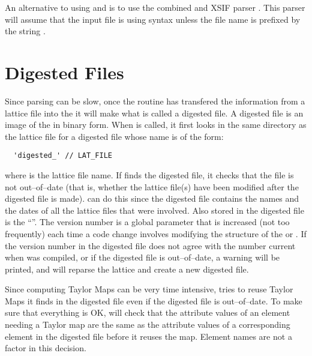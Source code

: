 An alternative to using  and  is to
use the combined \bmad and XSIF parser
. This parser
will assume that the input file is using \bmad syntax unless the file
name is prefixed by the string .

\section{Digested Files}

Since parsing can be slow, once the  routine
has transfered the
information from a lattice file into the  it will make
what is called a digested file. A digested file is an image of the
 in binary form. When  is called, 
it first looks in the same directory as the lattice
file for a digested file whose name is of the form:
\begin{verbatim}
  'digested_' // LAT_FILE 
\end{verbatim}
where  is the lattice file name. If  finds the digested
file, it checks that the file is not out--of--date (that is, whether the
lattice file(s) have been modified after the digested file is made).
 can do this since the digested file contains the names
and the dates of all the lattice files that were involved. Also stored
in the digested file is the ``\bmad {}''. The \bmad
version number is a global parameter that is increased (not too
frequently) each time a code change involves modifying the structure of
the  or . If the \bmad version number in
the digested file does not agree with the number current when 
was compiled, or if the digested
file is out--of--date, a warning will be printed, and 
will reparse the lattice and create a new digested file.

Since computing Taylor Maps can be very time intensive,
 tries to reuse Taylor Maps it finds in the digested
file even if the digested file is out--of--date. To
make sure that everything is OK,  will check that the attribute
values of an element needing a Taylor map are the same as the
attribute values of a corresponding element in the digested file
before it reuses the map. Element names are not a factor in this
decision.

